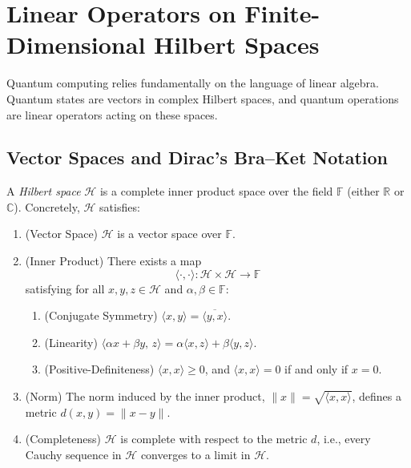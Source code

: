 \chapter{Linear Operators on Finite-Dimensional Hilbert Spaces}

Quantum computing relies fundamentally on the language of linear algebra. Quantum states are vectors in complex Hilbert spaces, and quantum operations are linear operators acting on these spaces.

\section{Vector Spaces and Dirac's Bra--Ket Notation}
\begin{definition}
	A \emph{Hilbert space} $\mathcal{H}$ is a complete inner product space over the field $\mathbb{F}$ (either $\mathbb{R}$ or $\mathbb{C}$). Concretely, $\mathcal{H}$ satisfies:
	\begin{enumerate}
		\item (Vector Space) $\mathcal{H}$ is a vector space over $\mathbb{F}$.
		\item (Inner Product) There exists a map
		\[
		\langle \cdot,\cdot\rangle:\mathcal{H}\times\mathcal{H}\to\mathbb{F}
		\]
		satisfying for all $x,y,z\in\mathcal{H}$ and $\alpha,\beta\in\mathbb{F}$:
		\begin{enumerate}
			\item (Conjugate Symmetry) $\langle x,y\rangle=\overline{\langle y,x\rangle}$.
			\item (Linearity) $\langle \alpha x+\beta y,\,z\rangle=\alpha\langle x,z\rangle+\beta\langle y,z\rangle$.
			\item (Positive-Definiteness) $\langle x,x\rangle\ge0$, and $\langle x,x\rangle=0$ if and only if $x=0$.
		\end{enumerate}
		\item (Norm) The norm induced by the inner product, $\|x\|=\sqrt{\langle x,x\rangle}$, defines a metric $d(x,y)=\|x-y\|$.
		\item (Completeness) $\mathcal{H}$ is complete with respect to the metric $d$, i.e., every Cauchy sequence in $\mathcal{H}$ converges to a limit in $\mathcal{H}$.
	\end{enumerate}
\end{definition}


